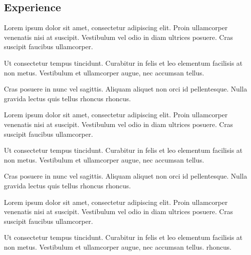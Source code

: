 \documentclass[]{plushcv}
\begin{document}
\begin{paracol}{2}

\switchcolumn[0]


\section{Experience}
\begin{tightemize}
\item Lorem ipsum dolor sit amet, consectetur adipiscing elit. Proin ullamcorper venenatis nisi at suscipit. Vestibulum vel odio in diam ultrices posuere. Cras suscipit faucibus ullamcorper.
\item Ut consectetur tempus tincidunt. Curabitur in felis et leo elementum facilisis at non metus. Vestibulum et ullamcorper augue, nec accumsan tellus. \item Cras posuere in nunc vel sagittis. Aliquam aliquet non orci id pellentesque. Nulla gravida lectus quis tellus rhoncus rhoncus.  
\end{tightemize}
\sectionsep

\begin{tightemize}
\item Lorem ipsum dolor sit amet, consectetur adipiscing elit. Proin ullamcorper venenatis nisi at suscipit. Vestibulum vel odio in diam ultrices posuere. Cras suscipit faucibus ullamcorper.
\item Ut consectetur tempus tincidunt. Curabitur in felis et leo elementum facilisis at non metus. Vestibulum et ullamcorper augue, nec accumsan tellus.
\item Cras posuere in nunc vel sagittis. Aliquam aliquet non orci id pellentesque. Nulla gravida lectus quis tellus rhoncus rhoncus.
\end{tightemize}
\sectionsep

\begin{tightemize}
\item Lorem ipsum dolor sit amet, consectetur adipiscing elit. Proin ullamcorper venenatis nisi at suscipit. Vestibulum vel odio in diam ultrices posuere. Cras suscipit faucibus ullamcorper.
\item Ut consectetur tempus tincidunt. Curabitur in felis et leo elementum facilisis at non metus. Vestibulum et ullamcorper augue, nec accumsan tellus.
 rhoncus.
\end{tightemize}
\sectionsep



\end{paracol}
\end{document}
